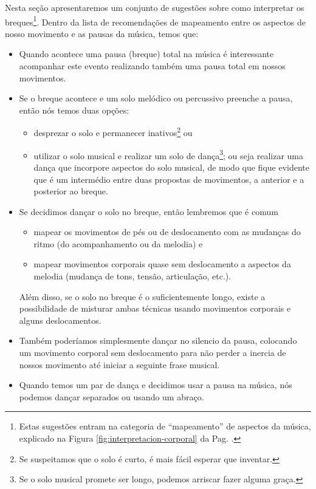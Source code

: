 Nesta seção apresentaremos um conjunto de sugestões  
sobre como interpretar os breques\footnote{Estas 
sugestões entram na categoria de ``mapeamento'' de aspectos da música, 
explicado na Figura \ref{fig:interpretacion-corporal} da Pag. \pageref{fig:interpretacion-corporal}.}.
Dentro da lista de recomendações de mapeamento entre os aspectos de nosso movimento e as pausas da música, 
temos que:
\begin{itemize}
\item Quando acontece uma pausa (breque) total na música 
é interessante acompanhar este evento realizando também uma pausa total em nossos movimentos.
\item Se o breque acontece e um solo melódico ou percussivo preenche a pausa,
então nós temos duas opções: 
\begin{itemize}
\item desprezar o solo e permanecer inativos\footnote{Se suspeitamos que o solo é curto, é mais fácil esperar que inventar.} ou
\item utilizar o solo musical e realizar um solo de dança\footnote{Se o solo musical promete ser longo, podemos arriscar fazer alguma graça.};
ou seja realizar uma dança que incorpore aspectos do solo musical,
de modo que fique evidente que é um intermédio entre duas propostas de movimentos,
a anterior e a posterior ao breque.
\end{itemize}
\item Se decidimos dançar o solo no breque, 
então lembremos que é comum 
\begin{itemize}
\item mapear os movimentos de pés ou de deslocamento com as mudanças do ritmo 
(do acompanhamento ou da melodia) e 
\item mapear movimentos corporais quase sem deslocamento a aspectos da melodia (mudança de tons, tensão, articulação, etc.).
\end{itemize}
Além disso, se o solo no breque é o suficientemente longo, 
existe a possibilidade de misturar ambas técnicas usando movimentos corporais e alguns deslocamentos.
\item Também poderíamos simplesmente dançar no silencio da pausa, colocando um movimento corporal sem deslocamento 
para não perder a inercia de nossos movimento até iniciar a seguinte frase musical.
\item Quando temos um par de dança e decidimos usar a pausa na música,
nós podemos dançar separados ou usando um abraço.
\begin{itemize}

\end{itemize}
\end{itemize}
